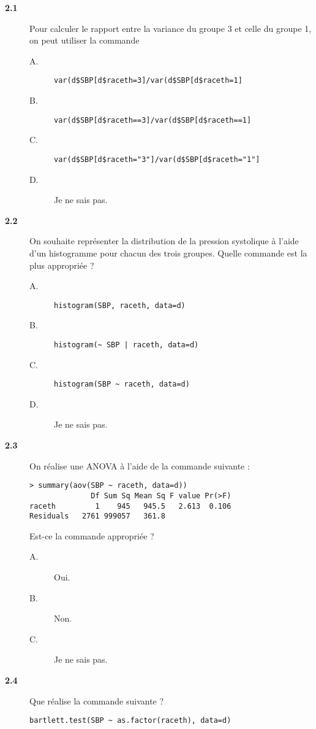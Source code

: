 \documentclass[11pt]{report}
\theoremstyle{definition}
\begin{document}
\begin{description}
\item[\bf 2.1]  Pour calculer le rapport entre la
  variance du groupe 3 et celle du groupe 1, on peut utiliser la commande
\begin{description}
\item[A.] \verb|var(d$SBP[d$raceth=3]/var(d$SBP[d$raceth=1]|
\item[B.] \verb|var(d$SBP[d$raceth==3]/var(d$SBP[d$raceth==1]|
\item[C.] \verb|var(d$SBP[d$raceth="3"]/var(d$SBP[d$raceth="1"]|
\item[D.] Je ne sais pas.
\end{description}  
\item[\bf 2.2]  On souhaite représenter la
  distribution de la pression systolique à l'aide d'un histogramme pour
  chacun des trois groupes. Quelle commande est la plus appropriée ?
  \begin{description}
  \item[A.] \verb|histogram(SBP, raceth, data=d)|
  \item[B.] \verb+histogram(~ SBP | raceth, data=d)+
  \item[C.] \verb|histogram(SBP ~ raceth, data=d)|
  \item[D.] Je ne sais pas.
  \end{description}  
\item[\bf 2.3]  On réalise une ANOVA à l'aide de la
  commande suivante :
\begin{verbatim}
> summary(aov(SBP ~ raceth, data=d))
              Df Sum Sq Mean Sq F value Pr(>F)
raceth         1    945   945.5   2.613  0.106
Residuals   2761 999057   361.8
\end{verbatim}
  Est-ce la commande appropriée ?  
  \begin{description}
  \item[A.] Oui.
  \item[B.] Non.
  \item[C.] Je ne sais pas.
  \end{description}  
\item[\bf 2.4]  Que réalise la commande suivante ? 
\begin{verbatim}
bartlett.test(SBP ~ as.factor(raceth), data=d)
\end{verbatim}
  \begin{description}

\end{description}
\end{description}
\end{document}
